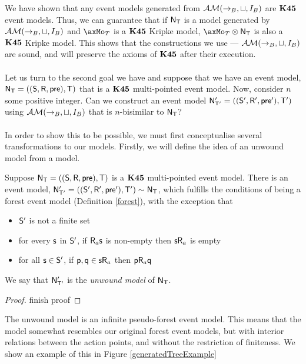 \newcommand{\EM}{\ensuremath{\eventClass}}

We have shown that any event models generated from $\EM(\to_B,\sqcup, I_B)$ are
$\bf K45$ event models.
Thus, we can guarantee that if $\mathrm{\mathsf{N}}_\mathrm{\mathsf{T}}$ is a model generated by
$\EM(\to_B,\sqcup,I_B)$ and $\axMo_T$ is a $\bf K45$ Kripke model, $\axMo_T
\otimes \evM_\evT$ is also a $\bf K45$ Kripke model.
This shows that the constructions we use --- $\EM(\to_B, \sqcup, I_B)$ are
sound, and will preserve the axioms of $\bf K45$ after their execution.\\
\\
Let us turn to the second goal we have and suppose that we have an event model, $\mathrm{\mathsf{N}}_\mathrm{\mathsf{T}}
= ((\mathrm{\mathsf{S}},\mathrm{\mathsf{R}},\mathrm{\mathsf{pre}}),\mathrm{\mathsf{T}})$ that is a $\bf K45$ multi-pointed event model.
Now, consider $n$ some positive integer.
Can we construct an event model $\mathrm{\mathsf{N}}'_{\mathrm{\mathsf{T}}'} = ((\mathrm{\mathsf{S}}',\mathrm{\mathsf{R}}',\mathrm{\mathsf{pre}}'),\mathrm{\mathsf{T}}')$
using $\EM(\to_B,\sqcup,I_B)$ that is $n$-bisimilar to $\mathrm{\mathsf{N}}_\mathrm{\mathsf{T}}$?\\
\\
In order to show this to be possible, we must first conceptualise several
transformations to our models.
Firstly, we will define the idea of an unwound model from a model.

\begin{lemma} \label{unwoundModel}
  Suppose $\mathrm{\mathsf{N}}_\mathrm{\mathsf{T}} = ((\mathrm{\mathsf{S}},\mathrm{\mathsf{R}},\mathrm{\mathsf{pre}}),\mathrm{\mathsf{T}})$ is a $\bf K45$ multi-pointed
  event model.
  There is an event model, $\mathrm{\mathsf{N}}'_{\mathrm{\mathsf{T}}'} = ((\mathrm{\mathsf{S}}',\mathrm{\mathsf{R}}',\mathrm{\mathsf{pre}}'),\mathrm{\mathsf{T}}') \sim
  \mathrm{\mathsf{N}}_\mathrm{\mathsf{T}}$, which fulfills the conditions of being a forest event model
  (Definition \ref{forest}), with the exception that
  \begin{itemize}
    \item $\mathrm{\mathsf{S}}'$ is not a finite set
    \item for every $\mathrm{\mathsf{s}}$ in $\mathrm{\mathsf{S}}'$, if $\mathrm{\mathsf{R}}_a \mathrm{\mathsf{s}}$ is non-empty then
    $\mathrm{\mathsf{s}} \mathrm{\mathsf{R}}_a$ is empty
    \item for all $\mathrm{\mathsf{s}} \in \mathrm{\mathsf{S}}'$, if $\mathrm{\mathsf{p}}, \mathrm{\mathsf{q}} \in \mathrm{\mathsf{s}} \mathrm{\mathsf{R}}_a$ then $\mathrm{\mathsf{p}}
    \mathrm{\mathsf{R}}_a \mathrm{\mathsf{q}}$
  \end{itemize}
  We say that $\mathrm{\mathsf{N}}'_{\mathrm{\mathsf{T}}'}$ is the {\em unwound model} of $\mathrm{\mathsf{N}}_\mathrm{\mathsf{T}}$.
\end{lemma}
\begin{proof}
  \FIXME finish proof
\end{proof}

The unwound model is an infinite pseudo-forest event model.
This means that the model somewhat resembles our original forest event models,
but with interior relations between the action points, and without the
restriction of finiteness.
We show an example of this in Figure \ref{generatedTreeExample}

